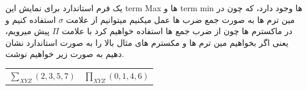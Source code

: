 \documentclass[pt, a5paper]{article}
\begin{document}
\newpage

یک فرم استاندارد برای نمایش این term Max ها و term min ها وجود دارد، که چون در مین ترم ها به صورت جمع ضرب ها عمل میکنیم میتوانیم از علامت
$\sigma$
استفاده کنیم و در ماکسترم ها چون از ضرب جمع ها استفاده خواهیم کرد با علامت
$\Pi$
پیش میرویم، یعنی اگر بخواهیم مین ترم ها و مکسترم های مثال بالا را به صورت استاندارد نشان دهیم به صورت زیر خواهیم نوشت.

\begin{LTR}
	\begin{tabular}{c | c}
		$\sum_{XYZ} (2, 3, 5, 7)$ & $\prod_{XYZ} (0,1,4,6)$
	\end{tabular}
\end{LTR}




























\end{document}
